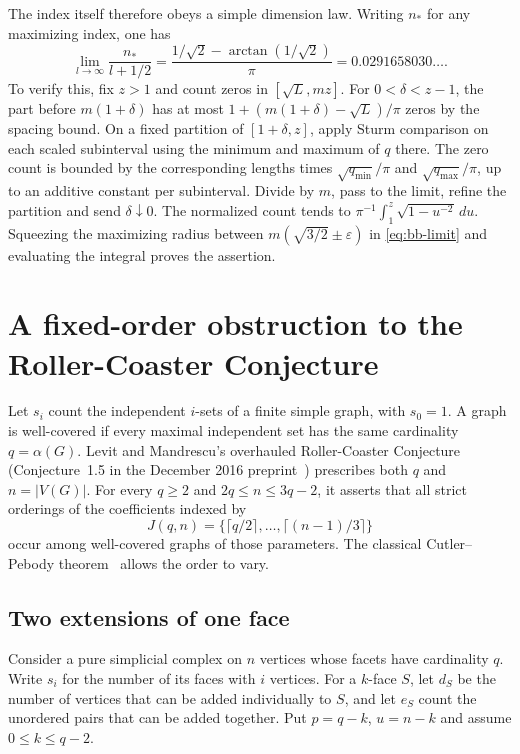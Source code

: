 \documentclass[11pt,a4paper]{article}
\theoremstyle{remark}\newtheorem{remark}[theorem]{Remark}
\numberwithin{equation}{section}
\begin{document}
The index itself therefore obeys a simple dimension law. Writing $n_*$ for
any maximizing index, one has
\[
 \lim_{l\to\infty}\frac{n_*}{l+1/2}
 =\frac{1/\sqrt 2-\arctan(1/\sqrt 2)}{\pi}
 =0.0291658030\ldots .
\]
To verify this, fix $z>1$ and count zeros in $[\sqrt L,mz]$.
For $0<\delta<z-1$, the part before $m(1+\delta)$ has at most
$1+(m(1+\delta)-\sqrt L)/\pi$ zeros by the spacing bound. On a fixed
partition of $[1+\delta,z]$, apply Sturm comparison on each scaled
subinterval using the minimum and maximum of $q$ there. The zero count
is bounded by the corresponding lengths times $\sqrt{q_{\min}}/\pi$ and
$\sqrt{q_{\max}}/\pi$, up to an additive constant per subinterval.
Divide by $m$, pass to the limit, refine the partition and send
$\delta\downarrow0$. The normalized count tends to
$\pi^{-1}\int_1^z\sqrt{1-u^{-2}}\,du$. Squeezing the maximizing radius
between $m(\sqrt{3/2}\pm\varepsilon)$ in \eqref{eq:bb-limit} and evaluating
the integral proves the assertion.

\section{A fixed-order obstruction to the Roller-Coaster Conjecture}
\label{sec:fixedroller}
Let $s_i$ count the independent $i$-sets of a finite simple graph, with
$s_0=1$. A graph is well-covered if every maximal independent set has the same
cardinality $q=\alpha(G)$. Levit and Mandrescu's overhauled Roller-Coaster
Conjecture (Conjecture~1.5 in the December 2016 preprint~\cite{LMroller})
prescribes both $q$ and $n=|V(G)|$. For every $q\ge2$ and $2q\le n\le3q-2$,
it asserts that all strict orderings of the coefficients indexed by
\[
 J(q,n)=\{\lceil q/2\rceil,\ldots,\lceil(n-1)/3\rceil\}
\]
occur among well-covered graphs of those parameters. The classical
Cutler--Pebody theorem~\cite{CProller} allows the order to vary.

\subsection{Two extensions of one face}
Consider a pure simplicial complex on $n$ vertices whose facets have
cardinality $q$. Write $s_i$ for the number of its faces with $i$ vertices.
For a $k$-face $S$, let $d_S$ be the number of vertices that can be added
individually to $S$, and let $e_S$ count the unordered pairs that can be
added together. Put $p=q-k$, $u=n-k$ and assume $0\le k\le q-2$.
\end{document}
